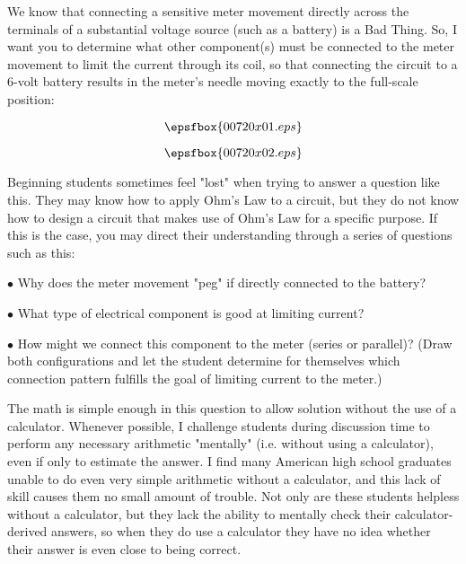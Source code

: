 

We know that connecting a sensitive meter movement directly across the terminals of a substantial voltage source (such as a battery) is a Bad Thing.  So, I want you to determine what other component(s) must be connected to the meter movement to limit the current through its coil, so that connecting the circuit to a 6-volt battery results in the meter's needle moving exactly to the full-scale position:

$$\epsfbox{00720x01.eps}$$







$$\epsfbox{00720x02.eps}$$







Beginning students sometimes feel "lost" when trying to answer a question like this.  They may know how to apply Ohm's Law to a circuit, but they do not know how to design a circuit that makes use of Ohm's Law for a specific purpose.  If this is the case, you may direct their understanding through a series of questions such as this:

\medskip
\item{$\bullet$} Why does the meter movement "peg" if directly connected to the battery?
\item{$\bullet$} What type of electrical component is good at limiting current?
\item{$\bullet$} How might we connect this component to the meter (series or parallel)?  (Draw both configurations and let the student determine for themselves which connection pattern fulfills the goal of limiting current to the meter.)
\medskip

The math is simple enough in this question to allow solution without the use of a calculator.  Whenever possible, I challenge students during discussion time to perform any necessary arithmetic "mentally" (i.e. without using a calculator), even if only to estimate the answer.  I find many American high school graduates unable to do even very simple arithmetic without a calculator, and this lack of skill causes them no small amount of trouble.  Not only are these students helpless without a calculator, but they lack the ability to mentally check their calculator-derived answers, so when they do use a calculator they have no idea whether their answer is even close to being correct.




